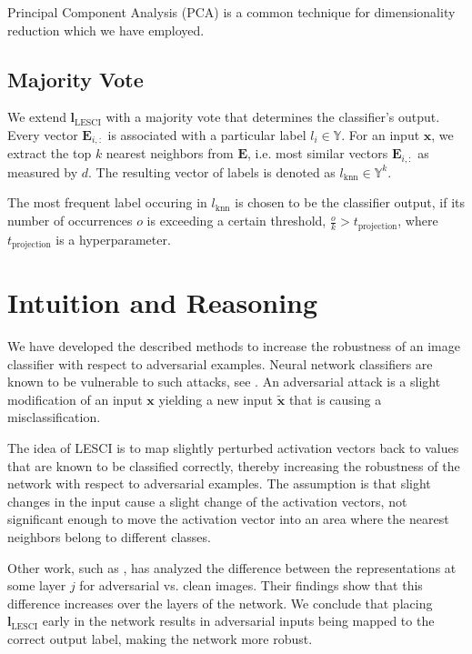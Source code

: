 \documentclass{article}
\begin{document}
Principal Component Analysis (PCA) is a common technique for dimensionality reduction which we have employed.

\subsection{Majority Vote}
We extend $\bm{l}_\text{LESCI}$ with a majority vote that determines the classifier's output. Every vector $\bm{E}_{i,:}$ is associated with a particular label $l_i\in\mathbb{Y}$. For an input $\bm{x}$, we extract the top $k$ nearest neighbors from $\bm{E}$, i.e. most similar vectors $\bm{E}_{i,:}$ as measured by $d$. The resulting vector of labels is denoted as $l_\text{knn}\in\mathbb{Y}^k$. 

The most frequent label occuring in $l_\text{knn}$ is chosen to be the classifier output, if its number of occurrences $o$ is exceeding a certain threshold, $\frac{o}{k}>t_\text{projection}$, where $t_\text{projection}$ is a hyperparameter.

\section{Intuition and Reasoning}

We have developed the described methods to increase the robustness of an image classifier with respect to adversarial examples. Neural network classifiers are known to be vulnerable to such attacks, see \cite{goodfellow-adversarial}. An adversarial attack is a slight modification of an input $\bm{x}$ yielding a new input $\tilde{\bm{x}}$ that is causing a misclassification.

The idea of LESCI is to map slightly perturbed activation vectors back to values that are known to be classified correctly, thereby increasing the robustness of the network with respect to adversarial examples. The assumption is that slight changes in the input cause a slight change of the activation vectors, not significant enough to move the activation vector into an area where the nearest neighbors belong to different classes.

Other work, such as \cite{layerwise-perturbations}, has analyzed the difference between the representations at some layer $j$ for adversarial vs. clean images. Their findings show that this difference increases over the layers of the network. We conclude that placing $\bm{l}_\text{LESCI}$ early in the network results in adversarial inputs being mapped to the correct output label, making the network more robust.
\end{document}
